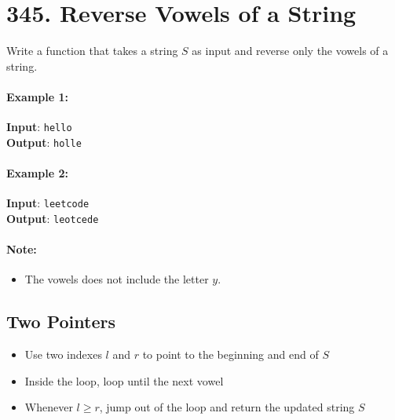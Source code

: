 \section{345. Reverse Vowels of a String}
Write a function that takes a string $S$ as input and reverse only the vowels of a string.

\paragraph{Example 1:}

\begin{flushleft}
\textbf{Input}: \texttt{hello}
\\
\textbf{Output}: \texttt{holle}
\end{flushleft}


\paragraph{Example 2:}

\begin{flushleft}
\textbf{Input}: \texttt{leetcode}
\\
\textbf{Output}: \texttt{leotcede}
\end{flushleft}

\paragraph{Note:}
\begin{itemize}
\item The vowels does not include the letter $y$.
\end{itemize}

\subsection{Two Pointers}
\begin{itemize}
\item Use two indexes $l$ and $r$ to point to the beginning and end of $S$
\item Inside the loop, loop until the next vowel
\item Whenever $l\geq r$, jump out of the loop and return the updated string $S$
\end{itemize}


